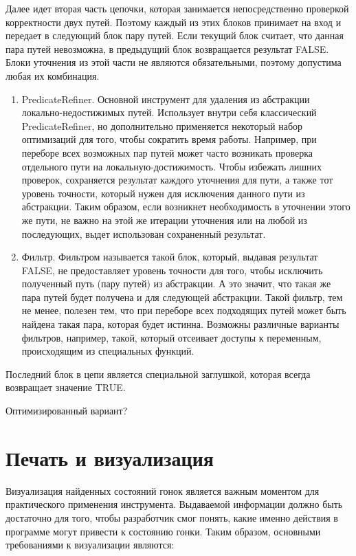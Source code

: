 Далее идет вторая часть цепочки, которая занимается непосредственно проверкой корректности двух путей. Поэтому каждый из этих блоков принимает на вход и передает в следующий блок пару путей. Если текущий блок считает, что данная пара путей невозможна, в предыдущий блок возвращается результат FALSE.
Блоки уточнения из этой части не являются обязательными, поэтому допустима любая их комбинация.

\begin{enumerate}

\item PredicateRefiner. Основной инструмент для удаления из абстракции локально-недостижимых путей. 
Использует внутри себя классический PredicateRefiner, но дополнительно применяется некоторый набор оптимизаций для того, чтобы сократить время работы.
Например, при переборе всех возможных пар путей может часто возникать проверка отдельного пути на локальную-достижимость. 
Чтобы избежать лишних проверок, сохраняется результат каждого уточнения для пути, а также тот уровень точности, который нужен для исключения данного пути из абстракции.
Таким образом, если возникнет необходимость в уточнении этого же пути, не важно на этой же итерации уточнения или на любой из последующих, выдет использован сохраненный результат. 

\item Фильтр. Фильтром называется такой блок, который, выдавая результат FALSE, не предоставляет уровень точности для того, чтобы исключить полученный путь (пару путей) из абстракции. А это значит, что такая же пара путей будет получена и для следующей абстракции.
Такой фильтр, тем не менее, полезен тем, что при переборе всех подходящих путей может быть найдена такая пара, которая будет истинна.
Возможны различные варианты фильтров, например, такой, который отсеивает доступы к переменным, происходящим из специальных функций. 

\end{enumerate}

Последний блок в цепи является специальной заглушкой, которая всегда возвращает значение TRUE.

Оптимизированный вариант?

\section{Печать и визуализация} \label{sect_impl_visualiztion}

Визуализация найденных состояний гонок является важным моментом для практического применения инструмента.
Выдаваемой информации должно быть достаточно для того, чтобы разработчик смог понять, какие именно действия в программе могут привести к состоянию гонки.
Таким образом, основными требованиями к визуализации являются:

